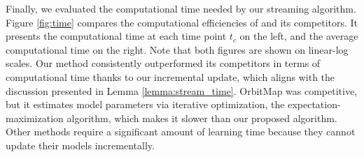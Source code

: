 Finally, we evaluated the computational time needed by our streaming algorithm.
Figure \ref{fig:time} compares the computational efficiencies
of \method and its competitors.
It presents the computational time at each time point $t_c$ on the left,
and the average computational time on the right.
Note that both figures are shown on linear-log scales.
Our method consistently outperformed its competitors
in terms of computational time
thanks to our incremental update,
which aligns with the discussion presented in Lemma \ref{lemma:stream_time}.
OrbitMap was competitive, but
it estimates model parameters via iterative optimization, the expectation-maximization algorithm,
which makes it slower than our proposed algorithm.
Other methods require a significant amount of learning time because
they cannot update their models incrementally.
